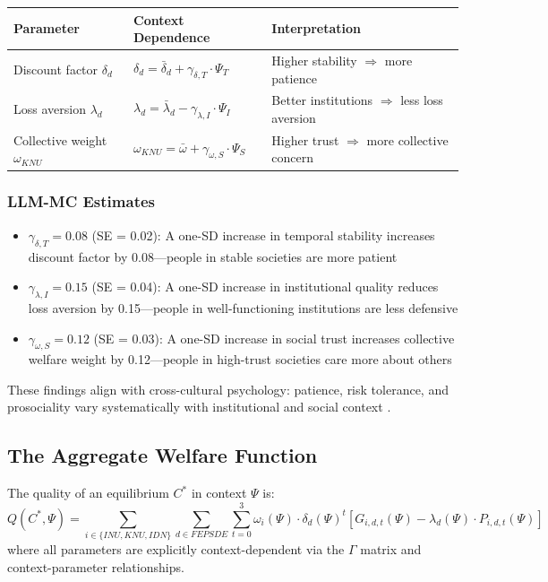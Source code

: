 \begin{center}
\renewcommand{\arraystretch}{1.3}
\begin{tabular}{lll}
\hline
\textbf{Parameter} & \textbf{Context Dependence} & \textbf{Interpretation} \\
\hline
Discount factor $\delta_d$ & $\delta_d = \bar{\delta}_d + \gamma_{\delta,T} \cdot \Psi_T$ & Higher stability $\Rightarrow$ more patience \\
Loss aversion $\lambda_d$ & $\lambda_d = \bar{\lambda}_d - \gamma_{\lambda,I} \cdot \Psi_I$ & Better institutions $\Rightarrow$ less loss aversion \\
Collective weight $\omega_{KNU}$ & $\omega_{KNU} = \bar{\omega} + \gamma_{\omega,S} \cdot \Psi_S$ & Higher trust $\Rightarrow$ more collective concern \\
\hline
\end{tabular}
\end{center}

\subsubsection{LLM-MC Estimates}

\begin{itemize}
  \item $\gamma_{\delta,T} = 0.08$ (SE = 0.02): A one-SD increase in temporal stability increases discount factor by 0.08---people in stable societies are more patient
  \item $\gamma_{\lambda,I} = 0.15$ (SE = 0.04): A one-SD increase in institutional quality reduces loss aversion by 0.15---people in well-functioning institutions are less defensive
  \item $\gamma_{\omega,S} = 0.12$ (SE = 0.03): A one-SD increase in social trust increases collective welfare weight by 0.12---people in high-trust societies care more about others
\end{itemize}

These findings align with cross-cultural psychology: patience, risk tolerance, and prosociality
vary systematically with institutional and social context \citep{PAP-enke2019globalpref}.

\subsection{The Aggregate Welfare Function}

\begin{definition}
The quality of an equilibrium $C^*$ in context $\Psi$ is:
\begin{equation}
  Q(C^*, \Psi) = \sum_{i \in \{INU, KNU, IDN\}} \sum_{d \in FEPSDE} \sum_{t=0}^{3} 
           \omega_i(\Psi) \cdot \delta_d(\Psi)^t \left[ G_{i,d,t}(\Psi) - \lambda_d(\Psi) \cdot P_{i,d,t}(\Psi) \right]
  \label{eq:eqquality-context}
\end{equation}
where all parameters are explicitly context-dependent via the $\Gamma$ matrix and context-parameter relationships.
\end{definition}

